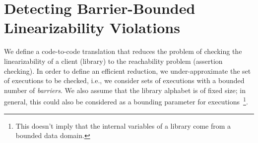\section{Detecting Barrier-Bounded Linearizability Violations}
\label{sec:objs}

We define 
a code-to-code translation that reduces the problem of checking the linearizability of a client (library) to the reachability problem (assertion checking). 
%
In order to define an efficient reduction, we under-approximate the set of executions to be checked, i.e., we consider sets of executions with a bounded number of \emph{barriers}. We also assume that the library alphabet is of fixed size; in general, this could also be considered as a bounding parameter for executions~\footnote{This doesn't imply that the internal variables of a library come from a bounded data domain.}. 

